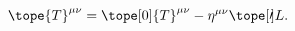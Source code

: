 \begin{equation}	\label{12.6}
\tope{T}^{\mu\nu}
=
\tope[0]{T}^{\mu\nu} - \eta^{\mu\nu} \tope[\prime\mspace{-3mu}]{L} .
	\end{equation}

